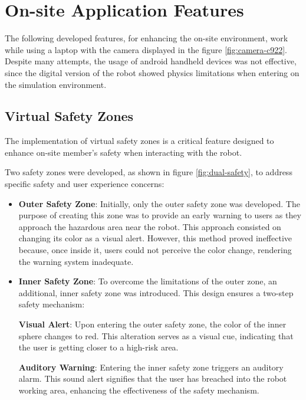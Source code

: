 \section{On-site Application Features}
\label{section:on-site-features}


    The following developed features, for enhancing the on-site environment, work while using a laptop with the camera displayed in 
    the figure \ref{fig:camera-c922}. Despite many attempts, the usage of android handheld devices was not effective, since the digital 
    version of the robot showed physics limitations when entering on the simulation environment.

    \subsection{Virtual Safety Zones}
    \label{subsection:virtual-safety-zones} 


        The implementation of virtual safety zones is a critical feature designed to enhance on-site member's safety when interacting with the robot. 

        Two safety zones were developed, as shown in figure \ref{fig:dual-safety}, to address specific safety and user experience concerns:

        \begin{itemize}
            \item \textbf{Outer Safety Zone}: Initially, only the outer safety zone was developed. The purpose of creating this zone was to provide an 
            early warning to users as they approach the hazardous area near the robot. This approach consisted on changing its color as a visual alert. 
            However, this method proved ineffective because, once inside it, users could not perceive the color change, rendering the warning system inadequate.
            
            \item \textbf{Inner Safety Zone}: To overcome the limitations of the outer zone, an additional, inner safety zone was introduced. 
            This design ensures a two-step safety mechanism:

                \textbf{Visual Alert}: Upon entering the outer safety zone, the color of the inner sphere changes to red. 
                This alteration serves as a visual cue, indicating that the user is getting closer to a high-risk area.

                \textbf{Auditory Warning}: Entering the inner safety zone triggers an auditory alarm. This sound alert signifies that the user has 
                breached into the robot working area, enhancing the effectiveness of the safety mechanism.
        \end{itemize}

